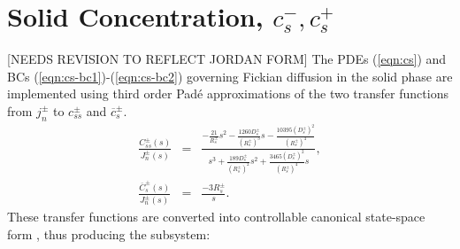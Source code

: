 \documentclass[12pt]{article}
\newcommand{\red}[1]{{\color{red}#1}}
\begin{document}
\section{Solid Concentration, $c_{s}^{-}, c_{s}^{+}$}\label{sec:cs}
\red{[NEEDS REVISION TO REFLECT JORDAN FORM]} The PDEs (\ref{eqn:cs}) and BCs (\ref{eqn:cs-bc1})-(\ref{eqn:cs-bc2}) governing Fickian diffusion in the solid phase are implemented using third order Pad\'{e} approximations of the two transfer functions from $j_{n}^{\pm}$ to $c_{ss}^{\pm}$ and $\overline{c}_{s}^{\pm}$. 
\begin{eqnarray}
	\frac{C_{ss}^{\pm}(s)}{J_{n}^{\pm}(s)} &=& \frac{-\frac{21}{R_{s}^{\pm}}s^{2} -\frac{1260 D_{s}^{\pm}}{(R_{s}^{\pm})^{3}}s -\frac{10395 (D_{s}^{\pm})^{2}}{ (R_{s}^{\pm})^{4} }  }{s^{3} + \frac{189 D_{s}^{\pm}}{(R_{s}^{\pm})^{2}} s^{2} + \frac{3465 (D_{s}^{\pm})^{2}}{(R_{s}^{\pm})^{4}} s }, \\
	\frac{\overline{C}_{s}^{\pm}(s)}{J_{n}^{\pm}(s)} &=& \frac{-3 R_{s}^{\pm}}{s}.
\end{eqnarray}
These transfer functions are converted into controllable canonical state-space form , thus producing the subsystem:
\end{document}
